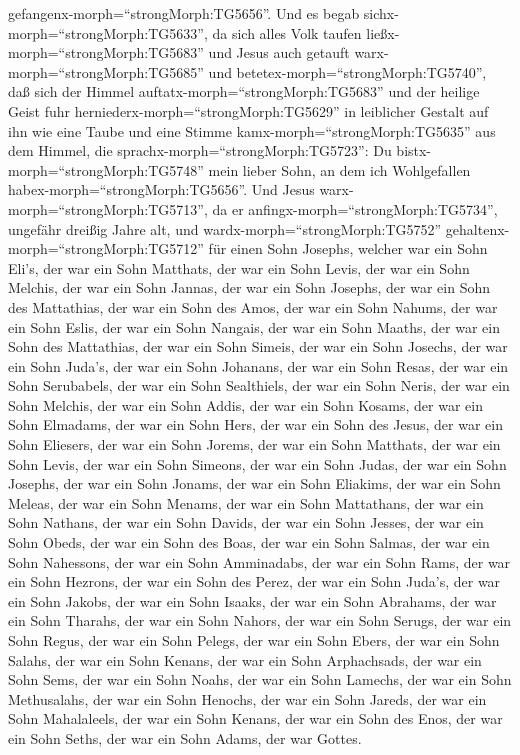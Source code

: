 gefangenx-morph=``strongMorph:TG5656''.  Und es begab
sichx-morph=``strongMorph:TG5633'', da sich alles Volk taufen
ließx-morph=``strongMorph:TG5683'' und Jesus auch getauft
warx-morph=``strongMorph:TG5685'' und
betetex-morph=``strongMorph:TG5740'', daß sich der Himmel
auftatx-morph=``strongMorph:TG5683''  und der heilige Geist
fuhr herniederx-morph=``strongMorph:TG5629'' in leiblicher Gestalt auf
ihn wie eine Taube und eine Stimme kamx-morph=``strongMorph:TG5635'' aus
dem Himmel, die sprachx-morph=``strongMorph:TG5723'': Du
bistx-morph=``strongMorph:TG5748'' mein lieber Sohn, an dem ich
Wohlgefallen habex-morph=``strongMorph:TG5656''.  Und Jesus
warx-morph=``strongMorph:TG5713'', da er
anfingx-morph=``strongMorph:TG5734'', ungefähr dreißig Jahre alt, und
wardx-morph=``strongMorph:TG5752''
gehaltenx-morph=``strongMorph:TG5712'' für einen Sohn Josephs, welcher
war ein Sohn Eli's,  der war ein Sohn Matthats, der war ein
Sohn Levis, der war ein Sohn Melchis, der war ein Sohn Jannas, der war
ein Sohn Josephs,  der war ein Sohn des Mattathias, der war
ein Sohn des Amos, der war ein Sohn Nahums, der war ein Sohn Eslis, der
war ein Sohn Nangais,  der war ein Sohn Maaths, der war ein
Sohn des Mattathias, der war ein Sohn Simeis, der war ein Sohn Josechs,
der war ein Sohn Juda's,  der war ein Sohn Johanans, der
war ein Sohn Resas, der war ein Sohn Serubabels, der war ein Sohn
Sealthiels, der war ein Sohn Neris,  der war ein Sohn
Melchis, der war ein Sohn Addis, der war ein Sohn Kosams, der war ein
Sohn Elmadams, der war ein Sohn Hers,  der war ein Sohn des
Jesus, der war ein Sohn Eliesers, der war ein Sohn Jorems, der war ein
Sohn Matthats, der war ein Sohn Levis,  der war ein Sohn
Simeons, der war ein Sohn Judas, der war ein Sohn Josephs, der war ein
Sohn Jonams, der war ein Sohn Eliakims,  der war ein Sohn
Meleas, der war ein Sohn Menams, der war ein Sohn Mattathans, der war
ein Sohn Nathans, der war ein Sohn Davids,  der war ein
Sohn Jesses, der war ein Sohn Obeds, der war ein Sohn des Boas, der war
ein Sohn Salmas, der war ein Sohn Nahessons,  der war ein
Sohn Amminadabs, der war ein Sohn Rams, der war ein Sohn Hezrons, der
war ein Sohn des Perez, der war ein Sohn Juda's,  der war
ein Sohn Jakobs, der war ein Sohn Isaaks, der war ein Sohn Abrahams, der
war ein Sohn Tharahs, der war ein Sohn Nahors,  der war ein
Sohn Serugs, der war ein Sohn Regus, der war ein Sohn Pelegs, der war
ein Sohn Ebers, der war ein Sohn Salahs,  der war ein Sohn
Kenans, der war ein Sohn Arphachsads, der war ein Sohn Sems, der war ein
Sohn Noahs, der war ein Sohn Lamechs,  der war ein Sohn
Methusalahs, der war ein Sohn Henochs, der war ein Sohn Jareds, der war
ein Sohn Mahalaleels, der war ein Sohn Kenans,  der war ein
Sohn des Enos, der war ein Sohn Seths, der war ein Sohn Adams, der war
Gottes.


